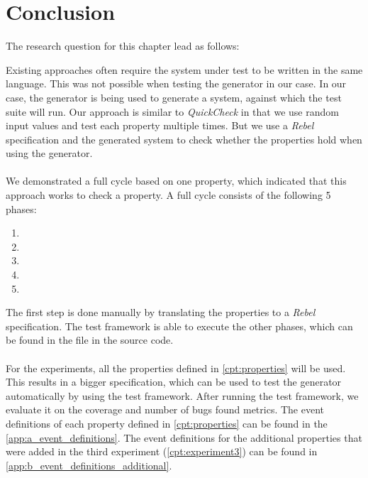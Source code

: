 \section{Conclusion}
The research question for this chapter lead as follows:
\begin{quote}
  \rqTwo{}
\end{quote}
Existing approaches often require the system under test to be written in the
same language. This was not possible when testing the generator in our case. In
our case, the generator is being used to generate a system, against which the
test suite will run. Our approach is similar to \textit{QuickCheck} in that we use
random input values and test each property multiple times. But we use a
\textit{Rebel} specification and the generated system to check whether the
properties hold when using the generator.\\
\\
We demonstrated a full cycle based on one property, which indicated that this
approach works to check a property. A full cycle consists of the following 5
phases:
\begin{enumerate}
\item \tfPhaseOne{}
\item \tfPhaseTwo{}
\item \tfPhaseThree{}
\item \tfPhaseFour{}
\item \tfPhaseFive{}
\end{enumerate}
The first step is done manually by translating the properties to a
\textit{Rebel} specification. The test framework is able to execute the other
phases, which can be found in the  file in the source code.\\
\\
For the experiments, all the properties defined in \autoref{cpt:properties}
will be used. This results in a bigger specification, which can be used to test
the generator automatically by using the test framework. After running the test
framework, we evaluate it on the coverage and number of bugs found metrics. The
event definitions of each property defined in \autoref{cpt:properties} can be
found in the \autoref{app:a_event_definitions}. The event definitions for the
additional properties that were added in the third experiment
(\autoref{cpt:experiment3}) can be found in
\autoref{app:b_event_definitions_additional}.

